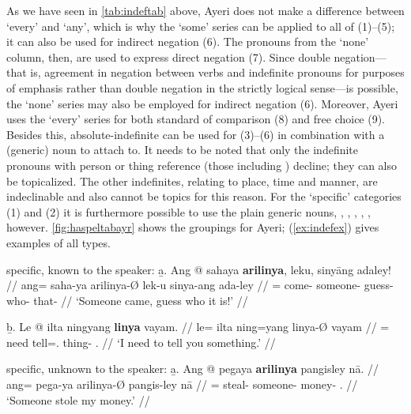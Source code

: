 As we have seen in \autoref{tab:indeftab} above, Ayeri does not make a
difference between `every' and `any', which is why the `some' series can be
applied to all of (1)--(5); it can also be used for indirect negation (6). The
pronouns from the `none' column, then, are used to express direct negation (7).
Since double negation---that is, agreement in negation between verbs and
indefinite pronouns for purposes of emphasis rather than double negation in the
strictly logical sense---is possible, the `none' series may also be employed
for indirect negation (6). Moreover, Ayeri uses the `every' series for both
standard of comparison (8) and free choice (9). Besides this, 
absolute-indefinite  can be used for (3)--(6) in combination 
with a (generic) noun to attach to. It needs to be noted that only the 
indefinite pronouns with person or thing reference (those including 
) decline; they can also be topicalized. The other indefinites, 
relating to place, time and manner, are indeclinable and also cannot be topics 
for this reason.
%
%
For the `specific' categories (1) and (2) it is furthermore possible to use the
plain generic nouns, , ,
, , , 
however. \autoref{fig:haspeltabayr} shows the groupings for Ayeri; 
(\ref{ex:indefex}) gives examples of all types.

\pex[labeltype=numeric,interpartskip=1em]\label{ex:indefex}
\a specific, known to the speaker:\vspace{.5em} %
	\beginsubsub
	\b{a.} \begingl
		\gla Ang @ sahaya \textbf{arilinya}, leku, sinyāng adaley! //
		\glb ang= saha-ya arilinya-Ø lek-u sinya-ang ada-ley //
		\glc \AgtT{}= come-\TsgM{} someone-\Top{} guess-\Imp{} 
			who-\Aarg{} that-\PargI{} //
		\glft `Someone came, guess who it is!' //
		\endgl\vspace{.5em}
		
	\b{b.} \begingl
		\gla Le @ ilta ningyang \textbf{linya} vayam. //
		\glb le= ilta ning=yang linya-Ø vayam //
		\glc \PatTI{}= need tell=\Fsg{}.\Aarg{} thing-\Top{} 
			\Second{}.\Dat{} //
		\glft `I need to tell you something.' //
		\endgl
	\endsubsub

\a specific, unknown to the speaker:\vspace{.5em} %
	\beginsubsub
	\b{a.} \begingl
		\gla Ang @ pegaya \textbf{arilinya} pangisley nā. //
		\glb ang= pega-ya arilinya-Ø pangis-ley nā //
		\glc \AgtT{}= steal-\TsgM{} someone-\Top{} money-\PargI{} 
			\Fsg{}.\Gen{} //
		\glft `Someone stole my money.' //
		\endgl\vspace{.5em}
		
